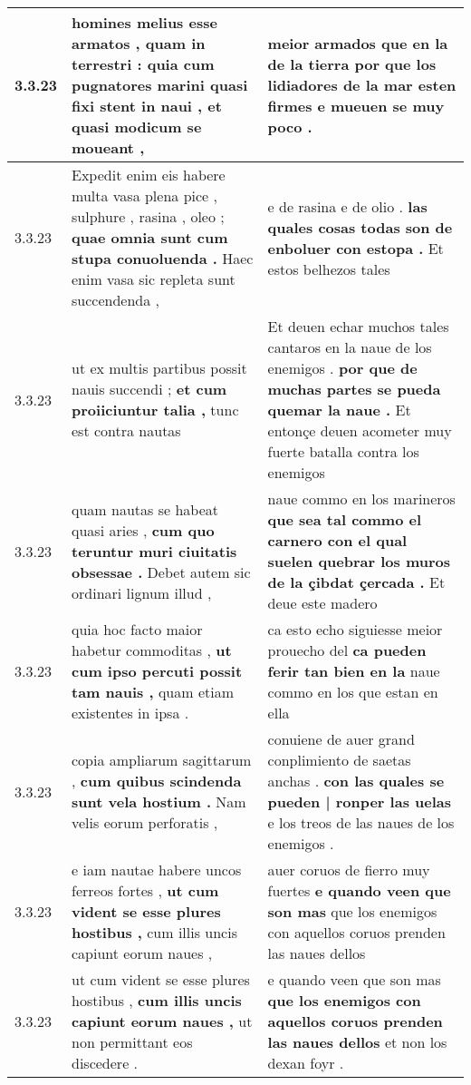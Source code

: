 \begin{tabular}{|p{1cm}|p{6.5cm}|p{6.5cm}|}
3.3.23 & homines melius esse armatos , quam in terrestri : \textbf{ quia cum pugnatores marini quasi fixi stent in naui , } et quasi modicum se moueant , & meior armados que en la de la tierra \textbf{ por que los lidiadores de la mar esten firmes } e mueuen se muy poco . \\\hline
3.3.23 & Expedit enim eis habere multa vasa plena pice , sulphure , rasina , oleo ; \textbf{ quae omnia sunt cum stupa conuoluenda . } Haec enim vasa sic repleta sunt succendenda , & e de rasina e de olio . \textbf{ las quales cosas todas son de enboluer con estopa . } Et estos belhezos tales \\\hline
3.3.23 & ut ex multis partibus possit nauis succendi ; \textbf{ et cum proiiciuntur talia , } tunc est contra nautas & Et deuen echar muchos tales cantaros en la naue de los enemigos . \textbf{ por que de muchas partes se pueda quemar la naue . } Et entonçe deuen acometer muy fuerte batalla contra los enemigos \\\hline
3.3.23 & quam nautas se habeat quasi aries , \textbf{ cum quo teruntur muri ciuitatis obsessae . } Debet autem sic ordinari lignum illud , & naue commo en los marineros \textbf{ que sea tal commo el carnero con el qual suelen quebrar los muros de la çibdat çercada . } Et deue este madero \\\hline
3.3.23 & quia hoc facto maior habetur commoditas , \textbf{ ut cum ipso percuti possit tam nauis , } quam etiam existentes in ipsa . & ca esto echo siguiesse meior prouecho del \textbf{ ca pueden ferir tan bien en la } naue commo en los que estan en ella \\\hline
3.3.23 & copia ampliarum sagittarum , \textbf{ cum quibus scindenda sunt vela hostium . } Nam velis eorum perforatis , & conuiene de auer grand conplimiento de saetas anchas . \textbf{ con las quales se pueden | ronper las uelas } e los treos de las naues de los enemigos . \\\hline
3.3.23 & e iam nautae habere uncos ferreos fortes , \textbf{ ut cum vident se esse plures hostibus , } cum illis uncis capiunt eorum naues , & auer coruos de fierro muy fuertes \textbf{ e quando veen que son mas } que los enemigos con aquellos coruos prenden las naues dellos \\\hline
3.3.23 & ut cum vident se esse plures hostibus , \textbf{ cum illis uncis capiunt eorum naues , } ut non permittant eos discedere . & e quando veen que son mas \textbf{ que los enemigos con aquellos coruos prenden las naues dellos } et non los dexan foyr . \\\hline

\end{tabular}
